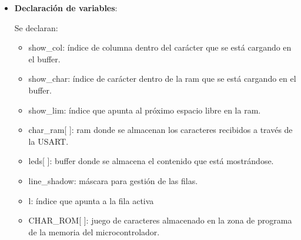 \begin{itemize}
\item{\textbf{Declaración de variables}:
  

  Se declaran:
  \begin{itemize}
    \item{show\_col: índice de columna dentro del carácter que se está cargando en el buffer.}
    \item{show\_char: índice de carácter dentro de la ram que se está cargando en el buffer.}
    \item{show\_lim: índice que apunta al próximo espacio libre en la ram.}
    \item{char\_ram[ ]: ram donde se almacenan los caracteres recibidos a través de la USART.}
    \item{leds[ ]: buffer donde se almacena el contenido que está mostrándose.}
    \item{line\_shadow: máscara para gestión de las filas.}
    \item{l: índice que apunta a la fila activa}
    \item{CHAR\_ROM[ ]: juego de caracteres almacenado en la zona de programa de la memoria del microcontrolador.}
  \end{itemize}
}

\end{itemize}
